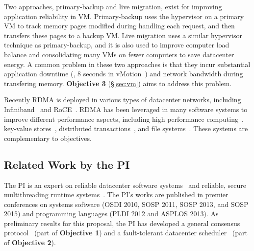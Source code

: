  Two approaches, primary-backup and live 
migration, exist for improving application reliability in VM. Primary-backup 
uses the hypervisor on a primary VM to track memory pages modified during 
handling each request, and then transfers these pages to a backup VM. Live 
migration uses a similar hypervisor technique as primary-backup, and it is 
also used to improve computer load balance and consolidating many VMs on fewer 
computers to save datacenter energy. A common problem in these two approaches 
is that they incur substantial application downtime (\eg, 8 seconds 
in vMotion~\cite{vmotion:atc05}) and network bandwidth during transfering 
memory. \textbf{Objective 3} (\S\ref{sec:vm}) aims to address this problem.


 Recently RDMA is deployed in various types of 
datacenter networks, including Infiniband~\cite{infiniband} and 
RoCE~\cite{roce}. RDMA has been leveraged in many 
software systems to improve different performance aspects, including high 
performance computing~\cite{openmpi}, key-value 
stores~\cite{pilaf:usenix14,herd:sigcomm14,farm:nsdi14,memcached:rdma}, 
distributed transactions~\cite{drtm:sosp15,farm:sosp15}, and file 
systems~\cite{gibson:nfs}. These systems are complementary to \xxx objectives.

\vspace{-.15in}\subsection{Related Work by the PI} 
\label{sec:my-work}\vspace{-.075in}
% 

The PI is an expert on reliable datacenter software systems~\cite{crane:sosp15, 
tripod:apsys16} and reliable, secure multithreading runtime 
systems~\cite{smt:cacm, cui:tern:osdi10, peregrine:sosp11, parrot:sosp13}. The 
PI's works are published in premier conferences on systems software (OSDI 2010, 
SOSP 2011, SOSP 2013, and SOSP 2015) and programming languages (PLDI 2012 and 
ASPLOS 2013). As preliminary results for this \xxx proposal, the PI has 
developed a general consensus protocol~\cite{crane:sosp15} (part of 
\textbf{Objective 1}) and a fault-tolerant datacenter 
scheduler~\cite{tripod:apsys16} (part of \textbf{Objective 2}).




